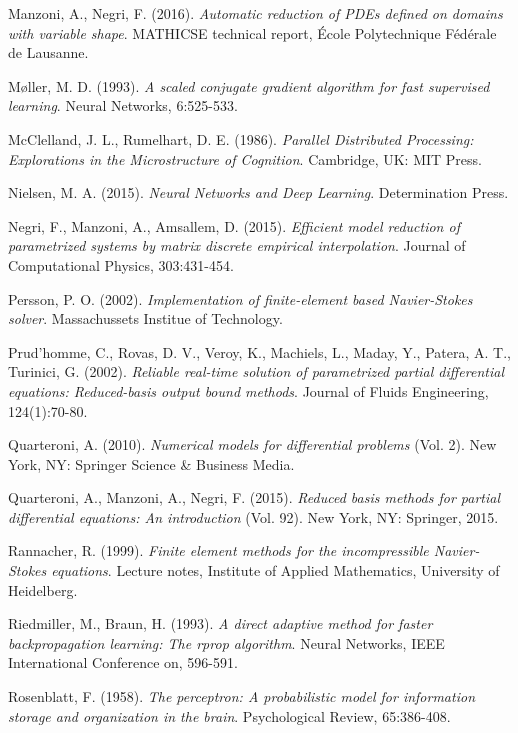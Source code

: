 \documentclass{elsarticle}
\theoremstyle{theorem}
\theoremstyle{definition}
\theoremstyle{remark}
\theoremstyle{proposition}
\numberwithin{figure}{section}
\begin{document}
\begin{thebibliography}{50}
		Manzoni, A., Negri, F. (2016). \emph{Automatic reduction of PDEs defined on domains with variable shape}. MATHICSE technical report, \'Ecole Polytechnique F\'ed\'erale de Lausanne.
		
		M\o{}ller, M. D. (1993). \emph{A scaled conjugate gradient algorithm for fast supervised learning}. Neural Networks, 6:525-533.
						
		McClelland, J. L., Rumelhart, D. E. (1986). \emph{Parallel Distributed Processing: Explorations in the Microstructure of Cognition}. Cambridge, UK: MIT Press.
		
		Nielsen, M. A. (2015). \emph{Neural Networks and Deep Learning}. Determination Press.
				
		Negri, F., Manzoni, A., Amsallem, D. (2015). \emph{Efficient model reduction of parametrized systems by matrix discrete empirical interpolation}. Journal of Computational Physics, 303:431-454.
		
		Persson, P. O. (2002). \emph{Implementation of finite-element based Navier-Stokes solver}. Massachussets Institue of Technology.
		
		Prud'homme, C., Rovas, D. V., Veroy, K., Machiels, L., Maday, Y., Patera, A. T., Turinici, G. (2002). \emph{Reliable real-time solution of parametrized partial differential equations: Reduced-basis output bound methods}. Journal of Fluids Engineering, 124(1):70-80.
		
		Quarteroni, A. (2010). \emph{Numerical models for differential problems} (Vol. 2). New York, NY: Springer Science \& Business Media.
		
		Quarteroni, A., Manzoni, A., Negri, F. (2015). \emph{Reduced basis methods for partial differential equations: An introduction} (Vol. 92). New York, NY: Springer, 2015.
		
		Rannacher, R. (1999). \emph{Finite element methods for the incompressible Navier-Stokes equations}. Lecture notes, Institute of Applied Mathematics, University of Heidelberg.
		
		Riedmiller, M., Braun, H. (1993). \emph{A direct adaptive method for faster backpropagation learning: The rprop algorithm}. Neural Networks, IEEE International Conference on, 596-591.
		
		Rosenblatt, F. (1958). \emph{The perceptron: A probabilistic model for information storage and organization in the brain}. Psychological Review, 65:386-408.
		

\end{thebibliography}
\end{document}
